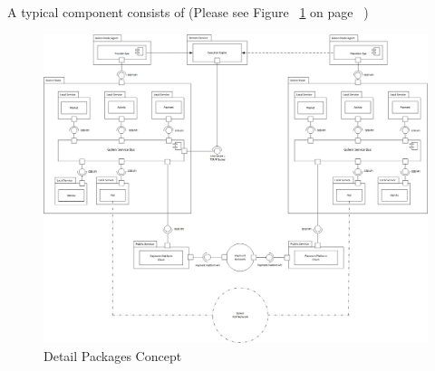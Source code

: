 \newpage

A typical component consists of (Please see Figure ~\ref{fig:DPC} on page ~\pageref{fig:DPC})

\begin{figure}[H]
    \centering
    \includegraphics[width=18cm,angle=0]{./diag/Abstract/DetailPackage-Abstract.png}
	\caption{Detail Packages Concept}
    \label{fig:DPC}
\end{figure}

